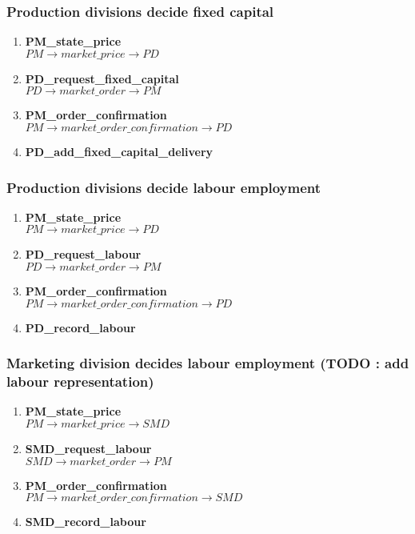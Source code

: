 \documentclass[11pt]{article}
\begin{document}
\subsubsection{Production divisions decide fixed capital}
\begin{enumerate}
	\item \textbf{PM\_state\_price} \\
	$ PM \rightarrow market\_price \rightarrow PD $
	\item \textbf{PD\_request\_fixed\_capital} \\
	$ PD \rightarrow market\_order \rightarrow PM $
	\item \textbf{PM\_order\_confirmation} \\
	$ PM \rightarrow market\_order\_confirmation \rightarrow PD $
	\item \textbf{PD\_add\_fixed\_capital\_delivery}
\end{enumerate}

\subsubsection{Production divisions decide labour employment}
\begin{enumerate}
	\item \textbf{PM\_state\_price} \\
	$ PM \rightarrow market\_price \rightarrow PD $
	\item \textbf{PD\_request\_labour} \\
	$ PD \rightarrow market\_order \rightarrow PM $
	\item \textbf{PM\_order\_confirmation} \\
	$ PM \rightarrow market\_order\_confirmation \rightarrow PD $
	\item \textbf{PD\_record\_labour}
\end{enumerate}

\subsubsection{Marketing division decides labour employment (TODO : add labour representation)}
\begin{enumerate}
	\item \textbf{PM\_state\_price} \\
	$ PM \rightarrow market\_price \rightarrow SMD $
	\item \textbf{SMD\_request\_labour} \\
	$ SMD \rightarrow market\_order \rightarrow PM $
	\item \textbf{PM\_order\_confirmation} \\
	$ PM \rightarrow market\_order\_confirmation \rightarrow SMD $
	\item \textbf{SMD\_record\_labour}
\end{enumerate}
\end{document}

